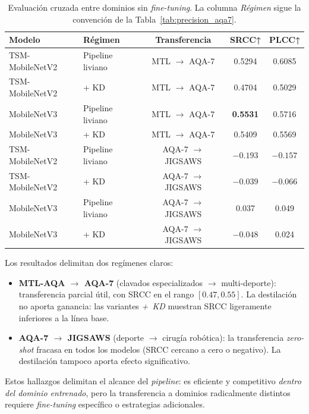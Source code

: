 \begin{table}[H]
\centering
\caption{Evaluación cruzada entre dominios sin \textit{fine-tuning}. La columna \textit{Régimen} sigue la convención de la Tabla~\ref{tab:precision_aqa7}.}
\label{tab:crossdomain}
\small
\begin{tabular}{llccc}
\toprule
\textbf{Modelo} & \textbf{Régimen} & \textbf{Transferencia} & \textbf{SRCC}↑ & \textbf{PLCC}↑ \\
\midrule
TSM-MobileNetV2 & Pipeline liviano & MTL $\to$ AQA-7 & 0.5294          & 0.6085 \\
TSM-MobileNetV2 & + KD             & MTL $\to$ AQA-7 & 0.4704          & 0.5029 \\
MobileNetV3     & Pipeline liviano & MTL $\to$ AQA-7 & \textbf{0.5531} & 0.5716 \\
MobileNetV3     & + KD             & MTL $\to$ AQA-7 & 0.5409          & 0.5569 \\
\midrule
TSM-MobileNetV2 & Pipeline liviano & AQA-7 $\to$ JIGSAWS & $-0.193$ & $-0.157$ \\
TSM-MobileNetV2 & + KD             & AQA-7 $\to$ JIGSAWS & $-0.039$ & $-0.066$ \\
MobileNetV3     & Pipeline liviano & AQA-7 $\to$ JIGSAWS & 0.037    & 0.049 \\
MobileNetV3     & + KD             & AQA-7 $\to$ JIGSAWS & $-0.048$ & 0.024 \\
\bottomrule
\end{tabular}
\end{table}

Los resultados delimitan dos regímenes claros:

\begin{itemize}
    \item \textbf{MTL-AQA $\to$ AQA-7} (clavados especializados $\to$ multi-deporte): transferencia parcial útil, con \ac{SRCC} en el rango $[0.47, 0.55]$. La destilación no aporta ganancia: las variantes \textit{+~KD} muestran \ac{SRCC} ligeramente inferiores a la línea base.
    \item \textbf{AQA-7 $\to$ JIGSAWS} (deporte $\to$ cirugía robótica): la transferencia \textit{zero-shot} fracasa en todos los modelos (\ac{SRCC} cercano a cero o negativo). La destilación tampoco aporta efecto significativo.
\end{itemize}

Estos hallazgos delimitan el alcance del \textit{pipeline}: es eficiente y competitivo \textit{dentro del dominio entrenado}, pero la transferencia a dominios radicalmente distintos requiere \textit{fine-tuning} específico o estrategias adicionales.

